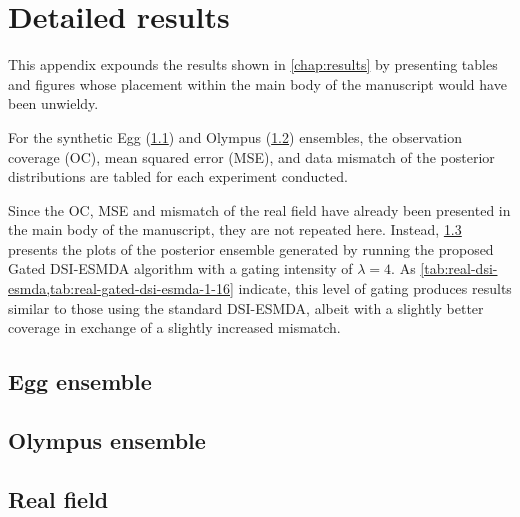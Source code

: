 \chapter{Detailed results}
\label{chap:detailed-results}

This appendix expounds the results shown in \cref{chap:results}
by presenting tables and figures whose placement within the main body of the manuscript would have been unwieldy.

For the synthetic 
Egg (\cref{sec:detailed-egg-ensemble}) and 
Olympus (\cref{sec:detailed-olympus-ensemble})
ensembles, the observation coverage (OC), mean squared error (MSE), and data mismatch 
of the posterior distributions are tabled for each experiment conducted.

Since the OC, MSE and mismatch of the real field have already been presented in the main body of the manuscript,
they are not repeated here. 
%
Instead, \cref{sec:detailed-real_field-ensemble} 
presents the plots of the posterior ensemble generated by running the proposed Gated DSI-ESMDA algorithm
with a gating intensity of $\lambda=4$.
%
As \cref{tab:real-dsi-esmda,tab:real-gated-dsi-esmda-1-16} indicate, 
this level of gating produces results similar to those using the standard DSI-ESMDA,
albeit with a slightly better coverage in exchange of a slightly increased mismatch.

\section{Egg ensemble}
\label{sec:detailed-egg-ensemble}
    
    
\vspace{-1.5cm}
\section{Olympus ensemble}
\label{sec:detailed-olympus-ensemble}
    

\section{Real field}
\label{sec:detailed-real_field-ensemble}
    